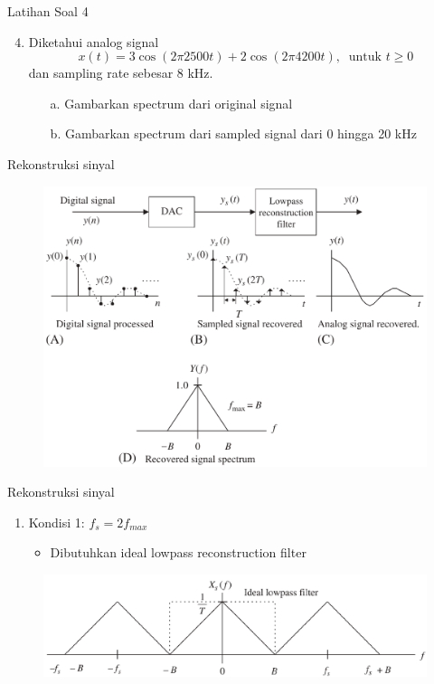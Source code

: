 \documentclass[pdflatex,compress,mathserif]{beamer}
\begin{document}
\begin{frame}{Latihan Soal 4}
    \begin{enumerate}
        \setcounter{enumi}{3}
        \item Diketahui analog signal
        \begin{equation*}
            x(t) = 3 \cos (2 \pi 2500 t) + 2 \cos (2 \pi 4200 t),~\text{ untuk } t \geq 0
        \end{equation*}
        dan sampling rate sebesar 8 kHz.
        \begin{enumerate}
            \item[a.] Gambarkan spectrum dari original signal
            \item[b.] Gambarkan spectrum dari sampled signal dari 0 hingga 20 kHz
        \end{enumerate}
    \end{enumerate}
\end{frame}

\begin{frame}{Rekonstruksi sinyal}
    \begin{figure}
        \includegraphics[width=0.9\linewidth]{img/img14.png}
    \end{figure}
\end{frame}

\begin{frame}{Rekonstruksi sinyal}
    \begin{enumerate}
        \item Kondisi 1: $f_s = 2f_{max}$
        \begin{itemize}
            \item Dibutuhkan ideal lowpass reconstruction filter
        \end{itemize}
    \end{enumerate}
    \begin{figure}
        \includegraphics[width=\linewidth]{img/img15.png}
    \end{figure}
\end{frame}
\end{document}

